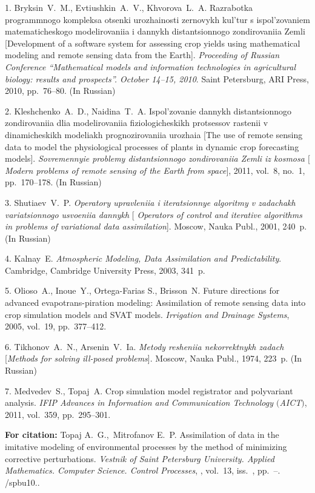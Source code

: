 

{\footnotesize

\vskip 4mm


\vskip 3mm

1. {Bryksin~V.~M., Evtiushkin~A.~V., Khvorova~L.~A.} Razrabotka
programmnogo kompleksa otsenki urozhainosti zernovykh kul'tur s
ispol'zovaniem matematicheskogo modelirovaniia i dannykh
distantsionnogo zondirovaniia Zemli [Development of a software
system for assessing crop yields using mathematical modeling and
remote sensing data from the Earth]. {\it Proceeding of Russian
Conference ``Mathematical models and information technologies in
agricultural biology: results and prospects''. October 14--15,
2010}. Saint Petersburg, ARI Press, 2010, pp.~76--80. (In Russian)

2. {Kleshchenko~A.~D., Naidina~T.~A.} Ispol'zovanie dannykh
distantsionnogo zondirovaniia dlia modelirovaniia
fiziologicheskikh protsessov rastenii v dinamicheskikh modeliakh
prognozirovaniia urozhaia [The use of remote sensing data to model
the physiological processes of plants in dynamic crop forecasting
models]. {\it Sovremennyie problemy distantsionnogo zondirovaniia
Zemli iz kosmosa  $[$Modern problems of remote sensing of the
Earth from space$]$}, 2011, vol.~8, no.~1, pp.~170--178. (In
Russian)

3. {Shutiaev~V.~P.} {\it Operatory upravleniia i iteratsionnye
algoritmy v zadachakh variatsionnogo usvoeniia dannykh} [{\it
Operators of control and iterative algorithms in problems of
variational data assimilation}]. Moscow, Nauka Publ., 2001, 240~p.
(In Russian)

4. {Kalnay~E.} {\it Atmospheric Modeling, Data Assimilation and
Predictability}. Cambridge, Cambridge University Press, 2003,
341~p.

5. {Olioso~A., Inoue~Y., Ortega-Farias S., Brisson~N.} Future
directions for advanced evapotrans-piration modeling: Assimilation
of remote sensing data into crop simulation models and SVAT
models. {\it Irrigation and Drainage Systems}, 2005, vol.~19,
pp.~377--412.

6. {Tikhonov~A.~N., Arsenin~V.~Ia.} {\it Metody resheniia
nekorrektnykh zadach} [{\it Methods for solving ill-posed
problems}]. Moscow, Nauka Publ., 1974, 223~p. (In Russian)

7. {Medvedev~S., Topaj~A.} Crop simulation model registrator and
polyvariant analysis. {\it IFIP Advances in Information and
Communication Technology $($AICT$)$}, 2011, vol.~359,
pp.~295--301.







\vskip 3mm

{\bf For citation:}   Topaj A.~G.,~Mitrofanov E.~P. Assimilation
of data in the imitative modeling of environmental processes by
the method of minimizing corrective perturbations. {\it Vestnik of
Saint Petersburg University. Applied Mathematics. Computer
Science. Control Processes}, \issueyear, vol.~13, iss.~\issuenum,
pp.~\pageref{p9}--\pageref{p9e}.
\doivyp/spbu10.\issueyear.


}

